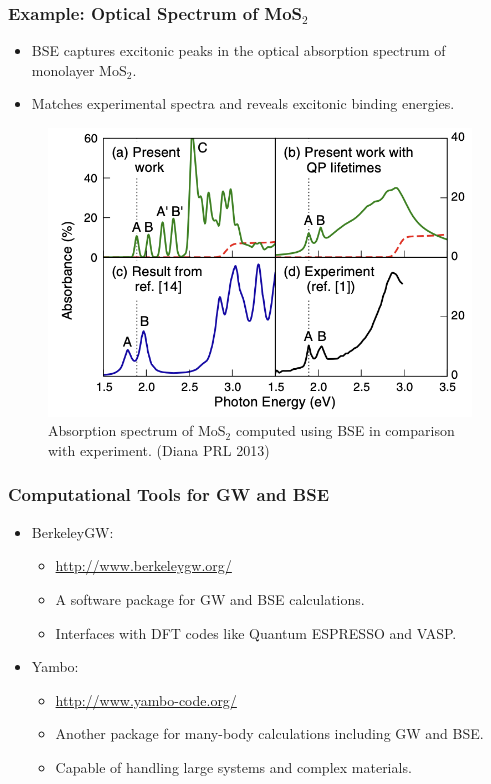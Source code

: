 \documentclass{CustomBeamer}
\begin{document}
        \begin{frame}
            \frametitle{Example: Optical Spectrum of MoS$_2$}
            \begin{itemize}
                \item BSE captures excitonic peaks in the optical absorption spectrum of monolayer MoS$_2$.
                \item Matches experimental spectra and reveals excitonic binding energies.
            \end{itemize}
            \begin{figure}
                \centering
                \includegraphics[width=0.4\linewidth]{bse_optical_spectrum2.png}
                \caption{  Absorption spectrum of MoS$_2$ computed using BSE in comparison with experiment. (Diana PRL 2013)}
            \end{figure}
            \end{frame}
        
        \begin{frame}
        \frametitle{Computational Tools for GW and BSE}
        \begin{itemize}
            \item BerkeleyGW: 
            \begin{itemize}
                \item \url{http://www.berkeleygw.org/}
                \item A software package for GW and BSE calculations.
                \item Interfaces with DFT codes like Quantum ESPRESSO and VASP.
            \end{itemize}
            \item Yambo: 
            \begin{itemize}
                \item \url{http://www.yambo-code.org/}
                \item Another package for many-body calculations including GW and BSE.
                \item Capable of handling large systems and complex materials.
            \end{itemize}
        \end{itemize}
        \end{frame}
        
\end{document}
